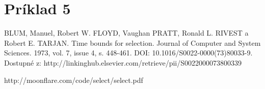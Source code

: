 \documentclass[paper=a4, fontsize=11pt]{scrartcl} %
\numberwithin{equation}{section} %
\numberwithin{figure}{section} %
\numberwithin{table}{section} %
\begin{document}
\section*{Príklad 5}
\begin{thebibliography}{1}
 BLUM, Manuel, Robert W. FLOYD, Vaughan PRATT, Ronald L. RIVEST a Robert E. TARJAN.
Time bounds for selection.
Journal of Computer and System Sciences. 1973, vol. 7, issue 4, s. 448-461.
DOI: 10.1016/S0022-0000(73)80033-9.
Dostupné z: http://linkinghub.elsevier.com/retrieve/pii/S0022000073800339

 http://moonflare.com/code/select/select.pdf
\end{thebibliography}
\end{document}
